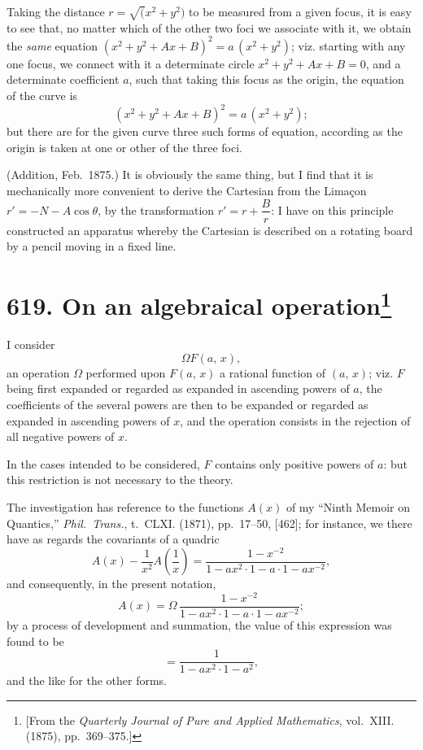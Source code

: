 \documentclass[11pt,a4paper]{book}
\begin{document}
Taking the distance $r = \surd(x^2+y^2)$ to be measured from a given focus, it is easy to see that, no matter which of the other two foci we associate with it, we obtain the \textit{same} equation $(x^2 + y^2 + Ax + B)^2 = a\,(x^2 + y^2)$; viz. starting with any one focus, we connect with it a determinate circle $x^2 + y^2 + Ax + B = 0$, and a determinate coefficient $a$, such that taking this focus as the origin, the equation of the curve is
\[
(x^2 + y^2 + Ax + B)^2 = a\,(x^2 + y^2);
\]
but there are for the given curve three such forms of equation, according as the origin is taken at one or other of the three foci.

(Addition, Feb.~1875.) It is obviously the same thing, but I find that it is mechanically more convenient to derive the Cartesian from the Lima\c{c}on $r' = -N - A\cos\theta$, by the transformation $r' = r + \dfrac{B}{r}$: I have on this principle constructed an apparatus whereby the Cartesian is described on a rotating board by a pencil moving in a fixed line.

\newpage
\section[On an algebraical operation]{\textbf{619.} On an algebraical operation\footnote{[From the \textit{Quarterly Journal of Pure and Applied Mathematics}, vol.~XIII. (1875), pp.~369--375.]}}

I consider
\[
\Omega F(a,\, x),
\]
an operation $\Omega$ performed upon $F(a,\, x)$ a rational function of $(a,\, x)$; viz. $F$ being first expanded or regarded as expanded in ascending powers of $a$, the coefficients of the several powers are then to be expanded or regarded as expanded in ascending powers of $x$, and the operation consists in the rejection of all negative powers of $x$.

In the cases intended to be considered, $F$ contains only positive powers of $a$: but this restriction is not necessary to the theory.

The investigation has reference to the functions $A(x)$ of my ``Ninth Memoir on Quantics,'' \textit{Phil.~Trans.}, t.~CLXI. (1871), pp.~17--50, [462]; for instance, we there have as regards the covariants of a quadric
\[
A(x) - \frac{1}{x^2}A\left(\frac{1}{x}\right) = \frac{1 - x^{-2}}{1 - ax^2 \cdot 1 - a \cdot 1 - ax^{-2}},
\]
and consequently, in the present notation,
\[
A(x) = \Omega\,\frac{1 - x^{-2}}{1 - ax^2 \cdot 1 - a \cdot 1 - ax^{-2}};
\]
by a process of development and summation, the value of this expression was found to be
\[
= \frac{1}{1 - ax^2 \cdot 1 - a^2},
\]
and the like for the other forms.
\end{document}
